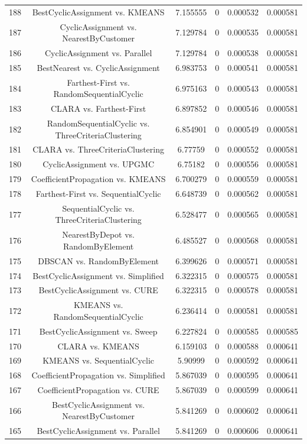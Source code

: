 \documentclass[a4paper,10pt]{article}
\begin{document}
\begin{landscape}
\begin{table}[!htp]
\begin{tabular}{cccccc}
188&BestCyclicAssignment vs. KMEANS&7.155555&0&0.000532&0.000581\\
187&CyclicAssignment vs. NearestByCustomer&7.129784&0&0.000535&0.000581\\
186&CyclicAssignment vs. Parallel&7.129784&0&0.000538&0.000581\\
185&BestNearest vs. CyclicAssignment&6.983753&0&0.000541&0.000581\\
184&Farthest-First vs. RandomSequentialCyclic&6.975163&0&0.000543&0.000581\\
183&CLARA vs. Farthest-First&6.897852&0&0.000546&0.000581\\
182&RandomSequentialCyclic vs. ThreeCriteriaClustering&6.854901&0&0.000549&0.000581\\
181&CLARA vs. ThreeCriteriaClustering&6.77759&0&0.000552&0.000581\\
180&CyclicAssignment vs. UPGMC&6.75182&0&0.000556&0.000581\\
179&CoefficientPropagation vs. KMEANS&6.700279&0&0.000559&0.000581\\
178&Farthest-First vs. SequentialCyclic&6.648739&0&0.000562&0.000581\\
177&SequentialCyclic vs. ThreeCriteriaClustering&6.528477&0&0.000565&0.000581\\
176&NearestByDepot vs. RandomByElement&6.485527&0&0.000568&0.000581\\
175&DBSCAN vs. RandomByElement&6.399626&0&0.000571&0.000581\\
174&BestCyclicAssignment vs. Simplified&6.322315&0&0.000575&0.000581\\
173&BestCyclicAssignment vs. CURE&6.322315&0&0.000578&0.000581\\
172&KMEANS vs. RandomSequentialCyclic&6.236414&0&0.000581&0.000581\\
171&BestCyclicAssignment vs. Sweep&6.227824&0&0.000585&0.000585\\
170&CLARA vs. KMEANS&6.159103&0&0.000588&0.000641\\
169&KMEANS vs. SequentialCyclic&5.90999&0&0.000592&0.000641\\
168&CoefficientPropagation vs. Simplified&5.867039&0&0.000595&0.000641\\
167&CoefficientPropagation vs. CURE&5.867039&0&0.000599&0.000641\\
166&BestCyclicAssignment vs. NearestByCustomer&5.841269&0&0.000602&0.000641\\
165&BestCyclicAssignment vs. Parallel&5.841269&0&0.000606&0.000641\\

\end{tabular}
\end{table}
\end{landscape}
\end{document}
